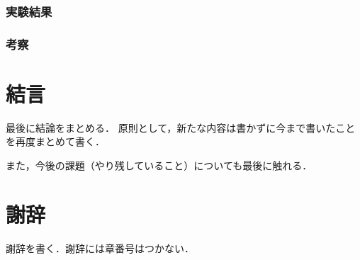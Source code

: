 \documentclass[12pt]{sonota/aislab}
\begin{document}
\subsection{実験結果}
\subsection{考察}

\chapter{結言}
最後に結論をまとめる．
原則として，新たな内容は書かずに今まで書いたことを再度まとめて書く．

また，今後の課題（やり残していること）についても最後に触れる．

\chapter*{謝辞}
謝辞を書く．謝辞には章番号はつかない．

\end{document}
